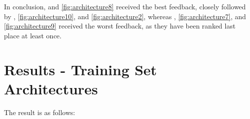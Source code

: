 In conclusion,  and \ref{fig:architecture8} received the best feedback, 
closely followed by , \ref{fig:architecture10}, and \ref{fig:architecture2},
whereas , \ref{fig:architecture7}, and \ref{fig:architecture9} received the worst feedback, as they have been ranked last place at least once.

\newpage

\section{Results - Training Set Architectures}
\label{sec:trainresults}

The result is as follows:

